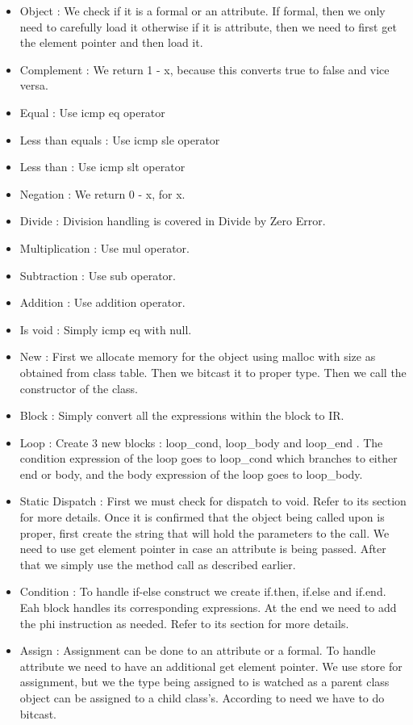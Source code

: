 \documentclass{article}
\begin{document}
\begin{itemize}
	\item Object : We check if it is a formal or an attribute. If formal, then  we only need to carefully load it otherwise if it is attribute, then we need to first get the element pointer and then load it. 
	\item Complement : We return 1 - x, because this converts true to false and vice versa.
	\item Equal : Use icmp eq operator
	\item Less than equals : Use icmp sle operator
	\item Less than : Use icmp slt operator
	\item Negation : We return 0 - x, for x.
	\item Divide : Division handling is covered in Divide by Zero Error.
	\item Multiplication : Use mul operator.
	\item Subtraction : Use sub operator.
	\item Addition : Use addition operator.
	\item Is void : Simply icmp eq with null.
	\item New : First we allocate memory for the object using malloc with size as obtained from class table. Then we bitcast it to proper type. Then we call the constructor of the class.
	\item Block : Simply convert all the expressions within the block to IR.
	\item Loop : Create 3 new blocks : loop\_cond, loop\_body and loop\_end . The condition expression of the loop goes to loop\_cond which branches to either end or body, and the body expression of the loop goes to loop\_body.
	\item Static Dispatch : First we must check for dispatch to void. Refer to its section for more details. Once it is confirmed that the object being called upon is proper, first create the string that will hold the parameters to the call. We need to use get element pointer in case an attribute is being passed. After that we simply use the method call as described earlier.
	\item Condition : To handle if-else construct we create if.then, if.else and if.end. Eah block handles its corresponding expressions. At the end we need to add the phi instruction as needed. Refer to its section for more details.
	\item Assign : Assignment can be done to an attribute or a formal. To handle attribute we need to have an additional get element pointer. We use store for assignment, but we the type being assigned to is watched as a parent class object can be assigned to a child class’s. According to need we have to do bitcast.
	
\end{itemize}
\end{document}

